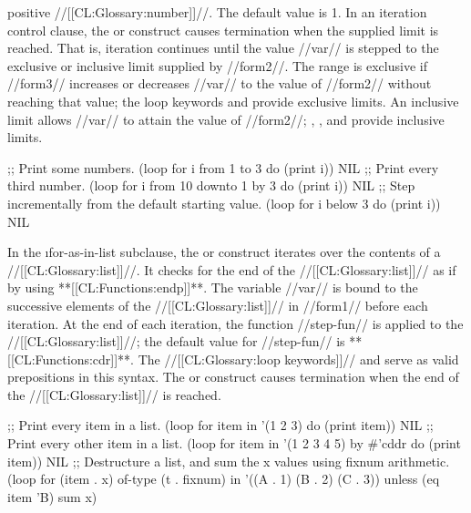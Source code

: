positive  //[[CL:Glossary:number]]//. The default value is 1.
  \endlist
  In an iteration control clause, the  or  construct causes termination when the supplied limit is reached.  That is, iteration continues until the value //var// is stepped to the exclusive or inclusive limit supplied by //form2//.  The range is exclusive if //form3// increases or decreases //var// to the value of //form2// without reaching that value; the loop keywords  and  provide exclusive limits.  An inclusive limit allows //var// to attain the value of //form2//; , , and  provide inclusive limits.  


\code ;; Print some numbers.
 (loop for i from 1 to 3
       do (print i))    \EV NIL
  ;; Print every third number.
 (loop for i from 10 downto 1 by 3
       do (print i))         \EV NIL
  ;; Step incrementally from the default starting value.
 (loop for i below 3
       do (print i))    \EV NIL \endcode
  \endsubsubsubsubsection%

\endsubsubsubsection%


In the \i{for-as-in-list} subclause, the   or  construct iterates over the contents of a  //[[CL:Glossary:list]]//.  It checks for  the end of the //[[CL:Glossary:list]]// as if by using **[[CL:Functions:endp]]**.   The variable //var// is bound to the successive elements  of  the //[[CL:Glossary:list]]// in //form1// before each iteration.  At the end of each iteration, the function //step-fun// is applied to the //[[CL:Glossary:list]]//; the default value for //step-fun// is **[[CL:Functions:cdr]]**. The //[[CL:Glossary:loop keywords]]//  and  serve as valid prepositions in this syntax. The  or  construct causes termination when the end of the //[[CL:Glossary:list]]// is reached.



\code ;; Print every item in a list.
 (loop for item in '(1 2 3) do (print item))    \EV NIL
  ;; Print every other item in a list.
 (loop for item in '(1 2 3 4 5) by #'cddr
       do (print item))    \EV NIL
  ;; Destructure a list, and sum the x values using fixnum arithmetic.
 (loop for (item . x) of-type (t . fixnum) in '((A . 1) (B . 2) (C . 3))
       unless (eq item 'B) sum x)  \endcode

